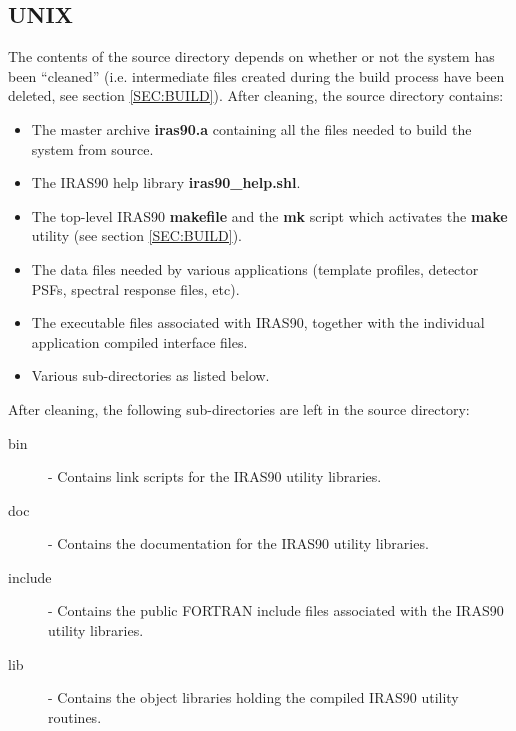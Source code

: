 \subsection{UNIX}
The contents of the source directory depends on whether
or not the system has been ``cleaned'' (i.e. intermediate files created during
the build process have been deleted, see section \ref{SEC:BUILD}). After
cleaning, the source directory contains:

\begin{itemize}

\item The master archive {\bf iras90.a} containing all the files needed to build
the system from source.

\item The {\small IRAS90} help library {\bf iras90\_help.shl}.

\item The top-level {\small IRAS90} {\bf makefile} and the {\bf mk} script which
activates the {\bf make} utility (see section \ref{SEC:BUILD}).

\item The data files needed by various applications (template profiles, detector
{\small PSF}s, spectral response files, etc).

\item The executable files associated with {\small IRAS90},
together with the individual application compiled interface files.

\item Various sub-directories as listed below.

\end{itemize}

After cleaning, the following sub-directories are left in the source directory:
\begin{description}

\item [bin] - Contains link scripts for the {\small IRAS90} utility
libraries.

\item [doc] - Contains the documentation for the {\small IRAS90} utility
libraries.

\item [include] - Contains the public {\small FORTRAN} include files associated
with the {\small IRAS90} utility libraries.

\item [lib] - Contains the object libraries holding the
compiled {\small IRAS90} utility routines.
\end{description}

